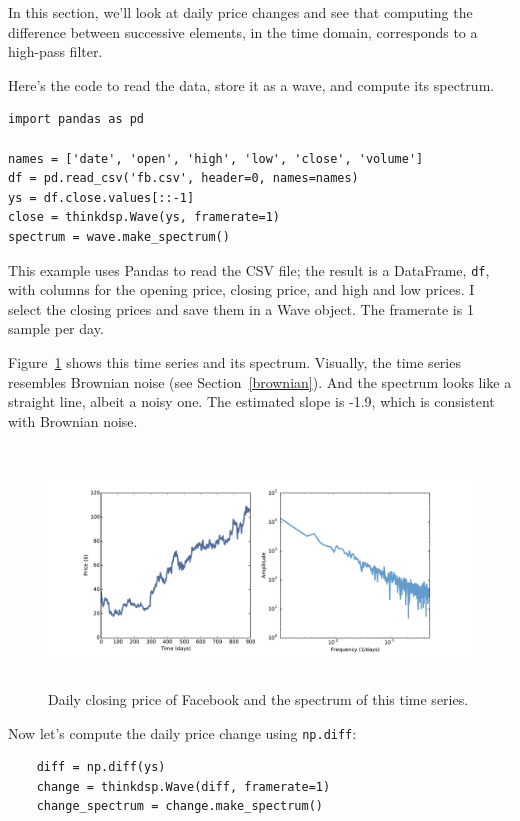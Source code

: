 \documentclass[12pt]{book}
\begin{document}
In this section, we'll look at daily price changes and
see that computing the difference between successive elements,
in the time domain, corresponds to a high-pass filter.

Here's the code to read the data, store it as a wave, and compute its
spectrum.

\begin{verbatim}
import pandas as pd

names = ['date', 'open', 'high', 'low', 'close', 'volume']
df = pd.read_csv('fb.csv', header=0, names=names)
ys = df.close.values[::-1]
close = thinkdsp.Wave(ys, framerate=1)
spectrum = wave.make_spectrum()
\end{verbatim}

This example uses Pandas to read the CSV file; the
result is a DataFrame, {\tt df}, with columns for the opening
price, closing price, and high and low prices.  I select the closing
prices and save them in a Wave object.
The framerate is 1 sample per day.  

Figure~\ref{fig.diff_int1} shows
this time series and its spectrum.
Visually, the time series resembles Brownian noise (see
Section~\ref{brownian}).
And the spectrum looks like a straight
line, albeit a noisy one.  The estimated slope is -1.9,
which is consistent with Brownian noise.

\begin{figure}
\centerline{\includegraphics[height=2.5in]{figs/diff_int1.pdf}}
\caption{Daily closing price of Facebook and the spectrum of this time
  series.}
\label{fig.diff_int1}
\end{figure}

Now let's compute the daily price change using {\tt np.diff}:

\begin{verbatim}
    diff = np.diff(ys)
    change = thinkdsp.Wave(diff, framerate=1)
    change_spectrum = change.make_spectrum()
\end{verbatim}
\end{document}
